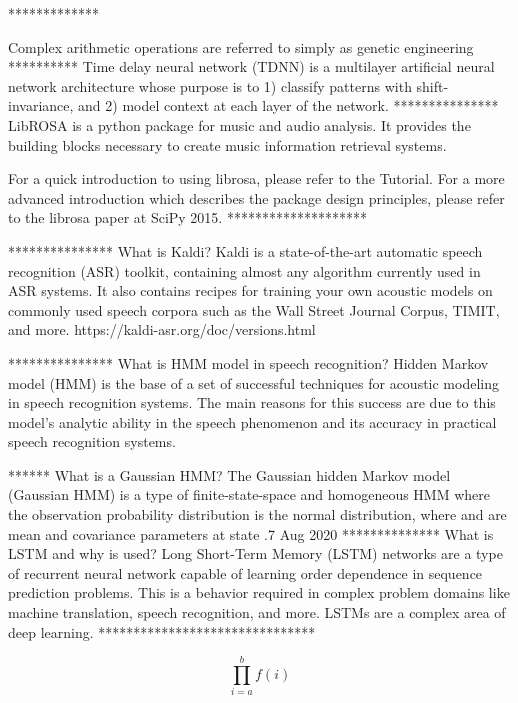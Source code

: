 





*************


Complex arithmetic operations are referred to simply as genetic engineering
**********
Time delay neural network (TDNN) is a multilayer artificial neural network architecture whose purpose is to 1) classify patterns with shift-invariance, and 2) model context at each layer of the network.
***************
LibROSA is a python package for music and audio analysis. It provides the building blocks necessary to create music information retrieval systems.

For a quick introduction to using librosa, please refer to the Tutorial. For a more advanced introduction which describes the package design principles, please refer to the librosa paper at SciPy 2015.
********************


***************
What is Kaldi? Kaldi is a state-of-the-art automatic speech recognition (ASR) toolkit, containing almost any algorithm currently used in ASR systems. It also contains recipes for training your own acoustic models on commonly used speech corpora such as the Wall Street Journal Corpus, TIMIT, and more.
https://kaldi-asr.org/doc/versions.html

 
***************
What is HMM model in speech recognition?
Hidden Markov model (HMM) is the base of a set of successful techniques for acoustic modeling in speech recognition systems. The main reasons for this success are due to this model's analytic ability in the speech phenomenon and its accuracy in practical speech recognition systems.

******
What is a Gaussian HMM?
The Gaussian hidden Markov model (Gaussian HMM) is a type of finite-state-space and homogeneous HMM where the observation probability distribution is the normal distribution, where and are mean and covariance parameters at state .7 Aug 2020
**************
What is LSTM and why is used?
Long Short-Term Memory (LSTM) networks are a type of recurrent neural network capable of learning order dependence in sequence prediction problems. This is a behavior required in complex problem domains like machine translation, speech recognition, and more. LSTMs are a complex area of deep learning.
*******************************

\[ \prod_{i=a}^{b} f(i) \]